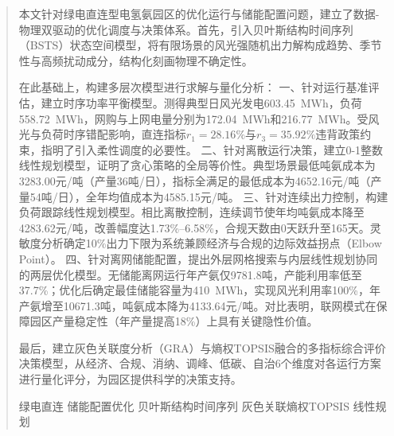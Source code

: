 \documentclass[a4paper]{neepumcm}
\begin{document}
\begin{abstract}
本文针对绿电直连型电氢氨园区的优化运行与储能配置问题，建立了数据-物理双驱动的优化调度与决策体系。首先，引入贝叶斯结构时间序列（BSTS）状态空间模型，将有限场景的风光强随机出力解构成趋势、季节性与高频扰动成分，结构化刻画物理不确定性。

在此基础上，构建多层次模型进行求解与量化分析：
一、针对运行基准评估，建立时序功率平衡模型。测得典型日风光发电603.45~MWh，负荷558.72~MWh，网购与上网电量分别为172.04~MWh和216.77~MWh。受风光与负荷时序错配影响，直连指标$r_1=28.16\%$与$r_3=35.92\%$违背政策约束，指明了引入柔性调度的必要性。
二、针对离散运行决策，建立0-1整数线性规划模型，证明了贪心策略的全局等价性。典型场景最低吨氨成本为3283.00元/吨（产量36吨/日），指标全满足的最低成本为4652.16元/吨（产量54吨/日），全年均值成本为4585.15元/吨。
三、针对连续出力控制，构建负荷跟踪线性规划模型。相比离散控制，连续调节使年均吨氨成本降至4283.62元/吨，改善幅度达1.73\%--6.58\%，合规天数由0天跃升至165天。灵敏度分析确定10\%出力下限为系统兼顾经济与合规的边际效益拐点（Elbow Point）。
四、针对离网储能配置，提出外层网格搜索与内层线性规划协同的两层优化模型。无储能离网运行年产氨仅9781.8吨，产能利用率低至37.7\%；优化后确定最佳储能容量为410~MWh，实现风光利用率100\%，年产氨增至10671.3吨，吨氨成本降为4133.64元/吨。对比表明，联网模式在保障园区产量稳定性（年产量提高18\%）上具有关键隐性价值。

最后，建立灰色关联度分析（GRA）与熵权TOPSIS融合的多指标综合评价决策模型，从经济、合规、消纳、调峰、低碳、自治6个维度对各运行方案进行量化评分，为园区提供科学的决策支持。

\begin{keywords}
绿电直连 \quad 储能配置优化 \quad 贝叶斯结构时间序列 \quad 灰色关联熵权TOPSIS \quad 线性规划
\end{keywords}
\end{abstract}

\maketitle
\newpage
\tableofcontents
\clearpage











\end{document}
